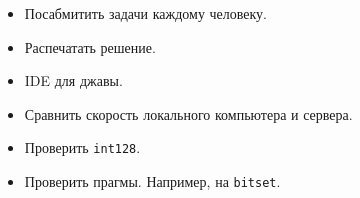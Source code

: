 \begin{itemize}
\item Посабмитить задачи каждому человеку.
\item Распечатать решение.
\item IDE для джавы.
\item Сравнить скорость локального компьютера и сервера.
\item Проверить \texttt{int128}.
\item Проверить прагмы. Например, на \texttt{bitset}.
\end{itemize}